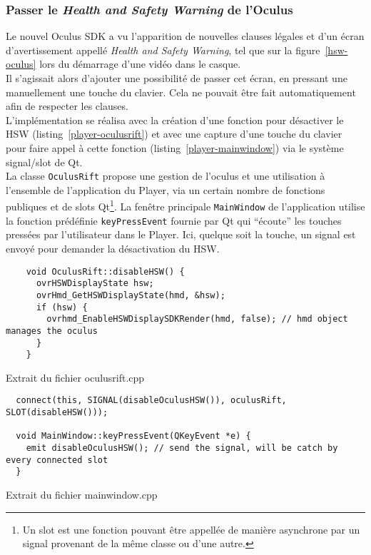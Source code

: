 \subsubsection{Passer le \textit{Health and Safety Warning} de l'Oculus}
Le nouvel Oculus SDK a vu l'apparition de nouvelles clauses légales et d'un écran
d'avertissement appellé \textit{Health and Safety Warning}, tel que sur la figure~\ref{hsw-oculus}
lors du démarrage d'une vidéo dans le casque\cite{oculus-developer-guide}.\\
Il s'agissait alors d'ajouter une possibilité de passer cet écran, en pressant une
manuellement une touche du clavier. Cela ne pouvait être fait automatiquement afin de respecter les clauses.
\ \\
L'implémentation se réalisa avec la création d'une fonction pour désactiver le HSW
(listing~\ref{player-oculusrift}) et avec une capture d'une touche du clavier pour faire appel à 
cette fonction (listing~\ref{player-mainwindow}) via le système signal/slot de Qt.\\
La classe \texttt{OculusRift} propose une gestion de l'oculus et une utilisation
à l'ensemble de l'application du Player, via un certain nombre de fonctions publiques
et de slots Qt\footnote{Un slot est une fonction pouvant être appellée de manière asynchrone 
par un signal provenant de la même classe ou d'une autre.}. La fenêtre principale \texttt{MainWindow}
de l'application utilise la fonction prédéfinie \texttt{keyPressEvent} fournie
par Qt qui \enquote{écoute} les touches pressées par l'utilisateur dans le Player.
Ici, quelque soit la touche, un signal est envoyé pour demander la désactivation du HSW.
\begin{listing}
  \begin{verbatim}
    void OculusRift::disableHSW() {
      ovrHSWDisplayState hsw;
      ovrHmd_GetHSWDisplayState(hmd, &hsw);
      if (hsw) {
        ovrhmd_EnableHSWDisplaySDKRender(hmd, false); // hmd object manages the oculus
      }
    }
  \end{verbatim}
  \caption{Extrait du fichier oculusrift.cpp}
  \label{player-oculusrift}
\end{listing}

\begin{listing}
  \begin{verbatim}
  connect(this, SIGNAL(disableOculusHSW()), oculusRift, SLOT(disableHSW()));
  
  void MainWindow::keyPressEvent(QKeyEvent *e) { 
    emit disableOculusHSW(); // send the signal, will be catch by every connected slot
  }
  \end{verbatim}
  \caption{Extrait du fichier mainwindow.cpp}
  \label{player-mainwindow}
\end{listing}


